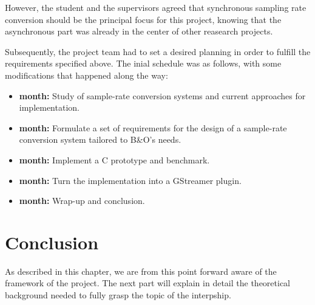 However, the student and the supervisors agreed that synchronous sampling rate conversion should be the principal focus for this project, knowing that the asynchronous part was already in the center of other reasearch projects.

Subsequently, the project team had to set a desired planning in order to fulfill the requirements specified above. The inial schedule was as follows, with some modifications that happened along the way: 

\begin{itemize}
	\item {} \textbf{month:} Study of sample-rate conversion systems and current approaches for implementation.
	\item {} \textbf{month:} Formulate a set of requirements for the design of a sample-rate conversion system tailored to  B\&O's needs.
	\item {} \textbf{month:} Implement a C prototype and benchmark.
	\item {} \textbf{month:} Turn the implementation into a GStreamer plugin.
	\item {} \textbf{month:} Wrap-up and conclusion. 
\end{itemize}



\section*{Conclusion}

As described in this chapter, we are from this point forward aware of the framework of the project. The next part will explain in detail the theoretical background needed to fully grasp the topic of the interpship. 
